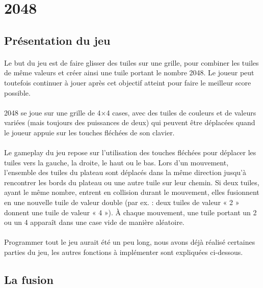\section{2048}
\subsection{Présentation du jeu}
\paragraph{}
Le but du jeu est de faire glisser des tuiles sur une grille, pour combiner les tuiles de même valeurs et créer ainsi une tuile portant le nombre 2048. Le joueur peut toutefois continuer à jouer après cet objectif atteint pour faire le meilleur score possible.


\paragraph{}
2048 se joue sur une grille de 4×4 cases, avec des tuiles de couleurs et de valeurs variées (mais toujours des puissances de deux) qui peuvent être déplacées quand le joueur appuie sur les touches fléchées de son clavier.






\paragraph{}
Le gameplay du jeu repose sur l'utilisation des touches fléchées pour déplacer les tuiles vers la gauche, la droite, le haut ou le bas. Lors d'un mouvement, l'ensemble des tuiles du plateau sont déplacés dans la même direction jusqu'à rencontrer les bords du plateau ou une autre tuile sur leur chemin. Si deux tuiles, ayant le même nombre, entrent en collision durant le mouvement, elles fusionnent en une nouvelle tuile de valeur double (par ex. : deux tuiles de valeur « 2 » donnent une tuile de valeur « 4 »). À chaque mouvement, une tuile portant un 2 ou un 4 apparaît dans une case vide de manière aléatoire.


\paragraph{}
Programmer tout le jeu aurait été un peu long, nous avons déjà réalisé certaines parties du jeu, les autres fonctions à implémenter sont expliquées ci-dessous.


\subsection{La fusion}


